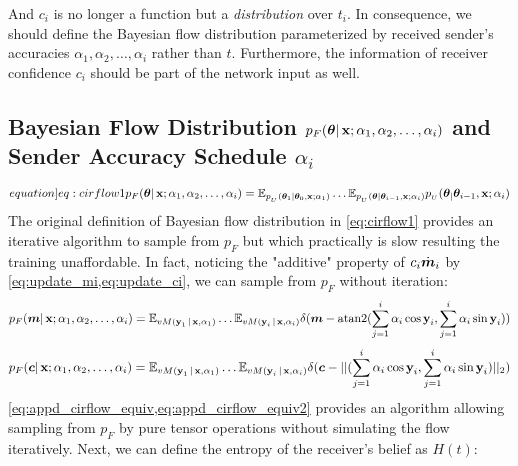 And $c_i$ is no longer a function but a \textit{distribution} over $t_i$. In consequence, we should define the Bayesian flow distribution parameterized by received sender's accuracies $\alpha_1,\alpha_2,\dots,\alpha_i$ rather than $t$. Furthermore, the information of receiver confidence $c_i$ should be part of the network input as well. 

\subsection{Bayesian Flow Distribution \texorpdfstring{$p_F(\bm{\theta}|\operatorname{\mathbf{x}};\alpha_1,\alpha_2,\dots,\alpha_i)$}{}  and Sender Accuracy Schedule \texorpdfstring{$\alpha_i$}{}}
\begin{equation}\label[equation]{eq:cirflow1}
    p_F(\btheta|\x;\alpha_1,\alpha_2,\dots,\alpha_i)=\E_{\update(\parsnt{1} \mid \parsnt{0}, \x ; \alphat{1})}\dots\E_{\update(\parsn \mid \parsnt{i-1}, \x ; \alphat{i})} \update(\parsnt | \parsnt{i-1},\x;\alphat{i} )
\end{equation}
The original definition of Bayesian flow distribution in \cref{eq:cirflow1} provides an iterative algorithm to sample from $p_F$ but which practically is slow resulting the training unaffordable. In fact, noticing the "additive" property of $c_i\dot{\bm{m}}_i$ by \cref{eq:update_mi,eq:update_ci}, we can sample from $p_F$ without iteration:
\begin{equation}\label{eq:appd_cirflow_equiv}
p_F(\boldsymbol{m}|\operatorname{\mathbf{x}};\alpha_1,\alpha_2,\dots,\alpha_i)=\mathbb{E}_{vM(\operatorname{\mathbf{y}}_1|\operatorname{\mathbf{x}},\alpha_1)}\dots\mathbb{E}_{vM(\operatorname{\mathbf{y}}_i|\operatorname{\mathbf{x}},\alpha_i)} \delta(\boldsymbol{m}-\text{atan2}(\sum_{j=1}^i \alpha_i \cos \operatorname{\mathbf{y}}_i,\sum_{j=1}^i \alpha_i \sin \operatorname{\mathbf{y}}_i))
\end{equation}
\begin{equation}\label{eq:appd_cirflow_equiv2}
p_F(\boldsymbol{c}|\operatorname{\mathbf{x}};\alpha_1,\alpha_2,\dots,\alpha_i)=\mathbb{E}_{vM(\operatorname{\mathbf{y}}_1|\operatorname{\mathbf{x}},\alpha_1)}\dots\mathbb{E}_{vM(\operatorname{\mathbf{y}}_i|\operatorname{\mathbf{x}},\alpha_i)} \delta(\boldsymbol{c}-||(\sum_{j=1}^i \alpha_i \cos \operatorname{\mathbf{y}}_i,\sum_{j=1}^i \alpha_i \sin \operatorname{\mathbf{y}}_i)||_2)
\end{equation}
\cref{eq:appd_cirflow_equiv,eq:appd_cirflow_equiv2} provides an algorithm allowing sampling from $p_F$ by pure tensor operations without simulating the flow iteratively. Next, we can define the entropy of the receiver's belief as $H(t)$:
